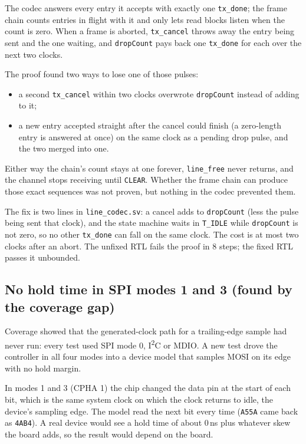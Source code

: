 \documentclass[11pt,a4paper]{article}
\newcommand{\sig}[1]{\texttt{#1}}
\begin{document}
The codec answers every entry it accepts with exactly one \sig{tx\_done}; the frame chain counts entries in flight with it and only lets read blocks listen when the count is zero. When a frame is aborted, \sig{tx\_cancel} throws away the entry being sent and the one waiting, and \sig{dropCount} pays back one \sig{tx\_done} for each over the next two clocks.

The proof found two ways to lose one of those pulses:
\begin{itemize}
\item a second \sig{tx\_cancel} within two clocks overwrote \sig{dropCount} instead of adding to it;
\item a new entry accepted straight after the cancel could finish (a zero-length entry is answered at once) on the same clock as a pending drop pulse, and the two merged into one.
\end{itemize}
Either way the chain's count stays at one forever, \sig{line\_free} never returns, and the channel stops receiving until \sig{CLEAR}. Whether the frame chain can produce those exact sequences was not proven, but nothing in the codec prevented them.

The fix is two lines in \sig{line\_codec.sv}: a cancel adds to \sig{dropCount} (less the pulse being sent that clock), and the state machine waits in \sig{T\_IDLE} while \sig{dropCount} is not zero, so no other \sig{tx\_done} can fall on the same clock. The cost is at most two clocks after an abort. The unfixed RTL fails the proof in 8 steps; the fixed RTL passes it unbounded.

\subsection{No hold time in SPI modes 1 and 3 (found by the coverage gap)}

Coverage showed that the generated-clock path for a trailing-edge sample had never run: every test used SPI mode 0, I\textsuperscript{2}C or MDIO. A new test drove the controller in all four modes into a device model that samples MOSI on its edge with no hold margin.

In modes 1 and 3 (CPHA 1) the chip changed the data pin at the start of each bit, which is the same system clock on which the clock returns to idle, the device's sampling edge. The model read the next bit every time (\texttt{A55A} came back as \texttt{4AB4}). A real device would see a hold time of about 0\,ns plus whatever skew the board adds, so the result would depend on the board.
\end{document}
